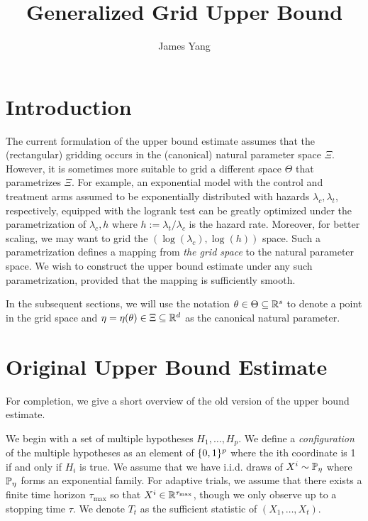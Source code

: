 \documentclass[10pt]{article}
\begin{document}
\title{Generalized Grid Upper Bound}
\author{James Yang}
\maketitle

\section{Introduction}\label{sec:intro}

The current formulation of the upper bound estimate assumes that the 
(rectangular) gridding occurs in the (canonical) natural parameter space $\Xi$.
However, it is sometimes more suitable to grid 
a different space $\Theta$ that parametrizes $\Xi$.
For example, an exponential model with the control and treatment arms assumed to be 
exponentially distributed with hazards $\lambda_c, \lambda_t$, respectively,
equipped with the logrank test
can be greatly optimized under the parametrization of $\lambda_{c}, h$
where $h := \lambda_t / \lambda_c$ is the hazard rate.
Moreover, for better scaling, we may want to grid 
the $(\log(\lambda_{c}), \log(h))$ space.
Such a parametrization defines a mapping from 
\emph{the grid space} to the natural parameter space.
We wish to construct the upper bound estimate under any 
such parametrization,
provided that the mapping is sufficiently smooth.

In the subsequent sections,
we will use the notation $\theta \in \Theta \subseteq \mathbb{R}^s$ to denote 
a point in the grid space and $\eta = \eta(\theta) \in \Xi \subseteq \mathbb{R}^d$
as the canonical natural parameter. 

\section{Original Upper Bound Estimate}\label{sec:orig-ub}

For completion, we give a short overview of the old version
of the upper bound estimate.

We begin with a set of multiple hypotheses $H_1,\ldots, H_p$.
We define a \emph{configuration} of the multiple hypotheses
as an element of $\{0,1\}^p$ where the ith coordinate is 1
if and only if $H_i$ is true.
We assume that we have i.i.d. draws of $X^i \sim \mathbb{P}_\eta$
where $\mathbb{P}_\eta$ forms an exponential family.
For adaptive trials, we assume that there exists a finite time horizon $\tau_{\max}$
so that $X^i \in \mathbb{R}^{\tau_{\max}}$, though we only observe up to a stopping time $\tau$.
We denote $T_{t}$ as the sufficient statistic of $(X_1,\ldots,X_t)$.
\end{document}
